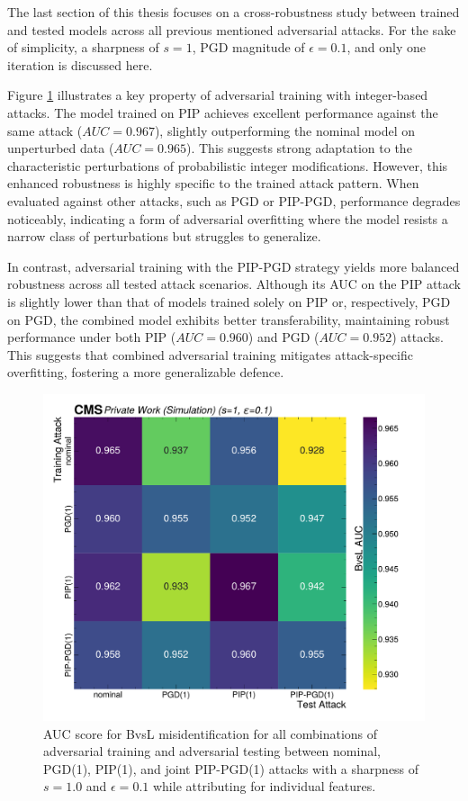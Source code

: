 The last section of this thesis focuses on a cross-robustness study between trained and tested models across all previous mentioned adversarial attacks. For the sake of simplicity, a sharpness of $s=1$, PGD magnitude of $\epsilon=0.1$, and only one iteration is discussed here.

Figure \ref{fig:cross_robustness} illustrates a key property of adversarial training with integer-based attacks. The model trained on PIP achieves excellent performance against the same attack ($AUC = 0.967$), slightly outperforming the nominal model on unperturbed data ($AUC = 0.965$). This suggests strong adaptation to the characteristic perturbations of probabilistic integer modifications. However, this enhanced robustness is highly specific to the trained attack pattern. When evaluated against other attacks, such as PGD or PIP-PGD, performance degrades noticeably, indicating a form of adversarial overfitting where the model resists a narrow class of perturbations but struggles to generalize.

In contrast, adversarial training with the PIP-PGD strategy yields more balanced robustness across all tested attack scenarios. Although its AUC on the PIP attack is slightly lower than that of models trained solely on PIP or, respectively, PGD on PGD, the combined model exhibits better transferability, maintaining robust performance under both PIP ($AUC = 0.960$) and PGD ($AUC = 0.952$) attacks. This suggests that combined adversarial training mitigates attack-specific overfitting, fostering a more generalizable defence.

\begin{figure}[h]
\centering
    \includegraphics[width=15cm]{media/cross_robustness.pdf}
    \caption{AUC score for BvsL misidentification for all combinations of adversarial training and adversarial testing between nominal, PGD(1), PIP(1), and joint PIP-PGD(1) attacks with a sharpness of $s=1.0$ and $\epsilon=0.1$ while attributing for individual features.}
    \label{fig:cross_robustness}
\end{figure}


